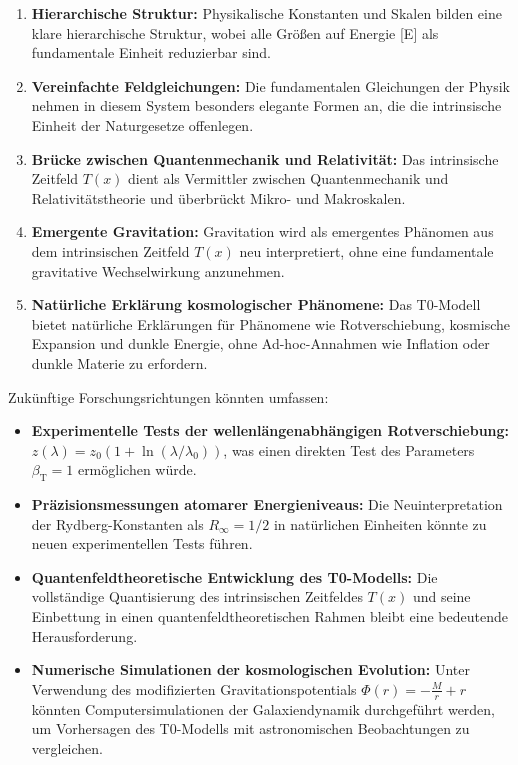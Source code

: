 \documentclass[12pt,a4paper]{article}
\newcommand{\Tfield}{T(x)}
\newcommand{\betaT}{\beta_{\text{T}}}
\begin{document}
\begin{enumerate}
\item \textbf{Hierarchische Struktur:} Physikalische Konstanten und Skalen bilden eine klare hierarchische Struktur, wobei alle Größen auf Energie [E] als fundamentale Einheit reduzierbar sind.

\item \textbf{Vereinfachte Feldgleichungen:} Die fundamentalen Gleichungen der Physik nehmen in diesem System besonders elegante Formen an, die die intrinsische Einheit der Naturgesetze offenlegen.

\item \textbf{Brücke zwischen Quantenmechanik und Relativität:} Das intrinsische Zeitfeld $\Tfield$ dient als Vermittler zwischen Quantenmechanik und Relativitätstheorie und überbrückt Mikro- und Makroskalen.

\item \textbf{Emergente Gravitation:} Gravitation wird als emergentes Phänomen aus dem intrinsischen Zeitfeld $\Tfield$ neu interpretiert, ohne eine fundamentale gravitative Wechselwirkung anzunehmen.

\item \textbf{Natürliche Erklärung kosmologischer Phänomene:} Das T0-Modell bietet natürliche Erklärungen für Phänomene wie Rotverschiebung, kosmische Expansion und dunkle Energie, ohne Ad-hoc-Annahmen wie Inflation oder dunkle Materie zu erfordern.
\end{enumerate}

Zukünftige Forschungsrichtungen könnten umfassen:

\begin{itemize}
\item \textbf{Experimentelle Tests der wellenlängenabhängigen Rotverschiebung:} $z(\lambda) = z_0(1+\ln(\lambda/\lambda_0))$, was einen direkten Test des Parameters $\betaT = 1$ ermöglichen würde.

\item \textbf{Präzisionsmessungen atomarer Energieniveaus:} Die Neuinterpretation der Rydberg-Konstanten als $R_\infty = 1/2$ in natürlichen Einheiten könnte zu neuen experimentellen Tests führen.

\item \textbf{Quantenfeldtheoretische Entwicklung des T0-Modells:} Die vollständige Quantisierung des intrinsischen Zeitfeldes $\Tfield$ und seine Einbettung in einen quantenfeldtheoretischen Rahmen bleibt eine bedeutende Herausforderung.

\item \textbf{Numerische Simulationen der kosmologischen Evolution:} Unter Verwendung des modifizierten Gravitationspotentials $\Phi(r) = -\frac{M}{r} + r$ könnten Computersimulationen der Galaxiendynamik durchgeführt werden, um Vorhersagen des T0-Modells mit astronomischen Beobachtungen zu vergleichen.
\end{itemize}
\end{document}
